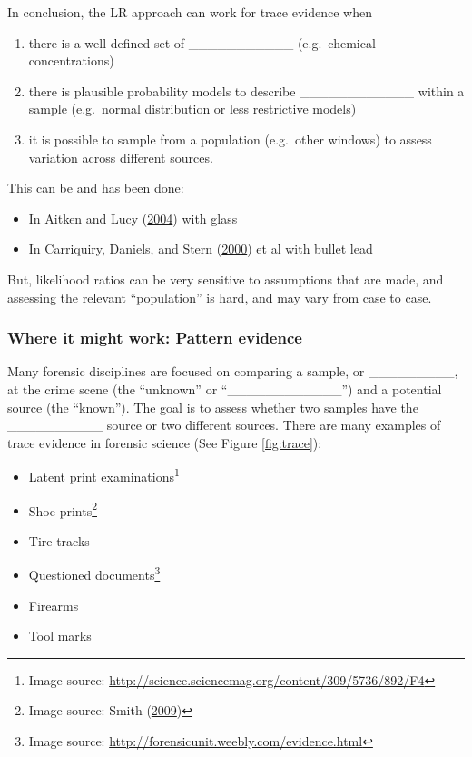\documentclass[]{book}
\providecommand{\tightlist}{%
  \setlength{\itemsep}{0pt}\setlength{\parskip}{0pt}}
\let\rmarkdownfootnote\footnote%
\def\footnote{\protect\rmarkdownfootnote}
\theoremstyle{definition}
\theoremstyle{definition}
\theoremstyle{remark}
\begin{document}
In conclusion, the LR approach can work for trace evidence when

\begin{enumerate}
\def\labelenumi{\arabic{enumi}.}
\tightlist
\item
  there is a well-defined set of \_\_\_\_\_\_\_\_\_\_\_ (e.g.~chemical
  concentrations)\vspace{.1in}
\item
  there is plausible probability models to describe
  \_\_\_\_\_\_\_\_\_\_\_\_ within a sample (e.g.~normal distribution or
  less restrictive models)\vspace{.1in}
\item
  it is possible to sample from a population (e.g.~other windows) to
  assess variation across different sources.
\end{enumerate}

This can be and has been done:

\begin{itemize}
\tightlist
\item
  In Aitken and Lucy (\protect\hyperlink{ref-aitkenlucy}{2004}) with
  glass
\item
  In Carriquiry, Daniels, and Stern
  (\protect\hyperlink{ref-aliciaetal}{2000}) et al with bullet lead
\end{itemize}

But, likelihood ratios can be very sensitive to assumptions that are
made, and assessing the relevant ``population'' is hard, and may vary
from case to case.

\subsubsection{Where it might work: Pattern
evidence}\label{where-it-might-work-pattern-evidence}

Many forensic disciplines are focused on comparing a sample, or
\_\_\_\_\_\_\_\_\_, at the crime scene (the ``unknown'' or
``\_\_\_\_\_\_\_\_\_\_\_\_'') and a potential source (the ``known'').
The goal is to assess whether two samples have the \_\_\_\_\_\_\_\_\_\_
source or two different sources. There are many examples of trace
evidence in forensic science (See Figure \ref{fig:trace}):

\begin{itemize}
\tightlist
\item
  Latent print examinations\footnote{Image source:
    \url{http://science.sciencemag.org/content/309/5736/892/F4}}
\item
  Shoe prints\footnote{Image source: Smith
    (\protect\hyperlink{ref-shoepic}{2009})}
\item
  Tire tracks
\item
  Questioned documents\footnote{Image source:
    \url{http://forensicunit.weebly.com/evidence.html}}
\item
  Firearms
\item
  Tool marks
\end{itemize}
\end{document}
